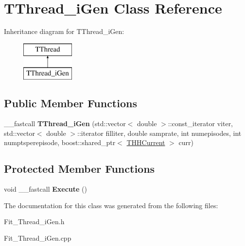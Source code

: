 \hypertarget{class_t_thread__i_gen}{\section{T\+Thread\+\_\+i\+Gen Class Reference}
\label{class_t_thread__i_gen}
}
Inheritance diagram for T\+Thread\+\_\+i\+Gen\+:\begin{figure}[H]
\begin{center}
\leavevmode
\includegraphics[height=2.000000cm]{class_t_thread__i_gen}
\end{center}
\end{figure}
\subsection*{Public Member Functions}
\begin{DoxyCompactItemize}
\item 
\hypertarget{class_t_thread__i_gen_a9b8ac0844a1206d65903a06a7cb9ac77}{\+\_\+\+\_\+fastcall {\bfseries T\+Thread\+\_\+i\+Gen} (std\+::vector$<$ double $>$\+::const\+\_\+iterator viter, std\+::vector$<$ double $>$\+::iterator filliter, double samprate, int numepisodes, int numptsperepisode, boost\+::shared\+\_\+ptr$<$ \hyperlink{class_t_h_h_current}{T\+H\+H\+Current} $>$ curr)}\label{class_t_thread__i_gen_a9b8ac0844a1206d65903a06a7cb9ac77}

\end{DoxyCompactItemize}
\subsection*{Protected Member Functions}
\begin{DoxyCompactItemize}
\item 
\hypertarget{class_t_thread__i_gen_accf451d4d3f194f0c4ff0f4a9b4735e5}{void \+\_\+\+\_\+fastcall {\bfseries Execute} ()}\label{class_t_thread__i_gen_accf451d4d3f194f0c4ff0f4a9b4735e5}

\end{DoxyCompactItemize}


The documentation for this class was generated from the following files\+:\begin{DoxyCompactItemize}
\item 
Fit\+\_\+\+Thread\+\_\+i\+Gen.\+h\item 
Fit\+\_\+\+Thread\+\_\+i\+Gen.\+cpp\end{DoxyCompactItemize}
